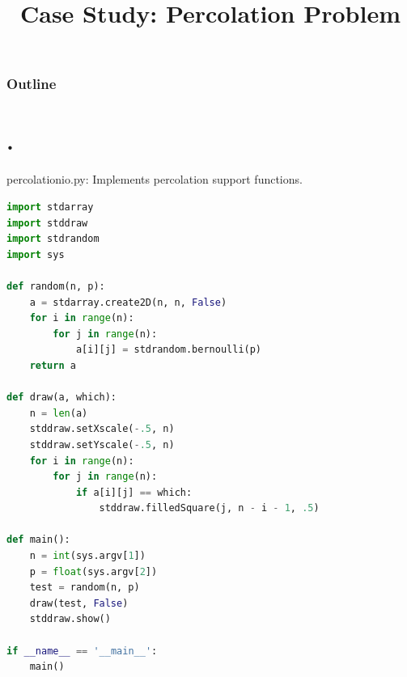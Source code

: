 \documentclass[8pt,a4paper,compress,handout]{beamer}
\title{Case Study: Percolation Problem}
\date{}
\begin{document}
\begin{frame}
\vfill
\titlepage
\end{frame}

\begin{frame}
\frametitle{Outline}
\tableofcontents
\end{frame}

\section{.}
\begin{frame}[fragile]
\begin{framed}
\tiny percolationio.py: Implements percolation support functions.
\end{framed}

\begin{lstlisting}[language=Python]
import stdarray
import stddraw
import stdrandom
import sys

def random(n, p):
    a = stdarray.create2D(n, n, False)
    for i in range(n):
        for j in range(n):
            a[i][j] = stdrandom.bernoulli(p)
    return a

def draw(a, which):
    n = len(a)
    stddraw.setXscale(-.5, n)
    stddraw.setYscale(-.5, n)
    for i in range(n):
        for j in range(n):
            if a[i][j] == which:
                stddraw.filledSquare(j, n - i - 1, .5)

def main():
    n = int(sys.argv[1])
    p = float(sys.argv[2])
    test = random(n, p)
    draw(test, False)
    stddraw.show()
    
if __name__ == '__main__':
    main()
\end{lstlisting}
\end{frame}
\end{document}
